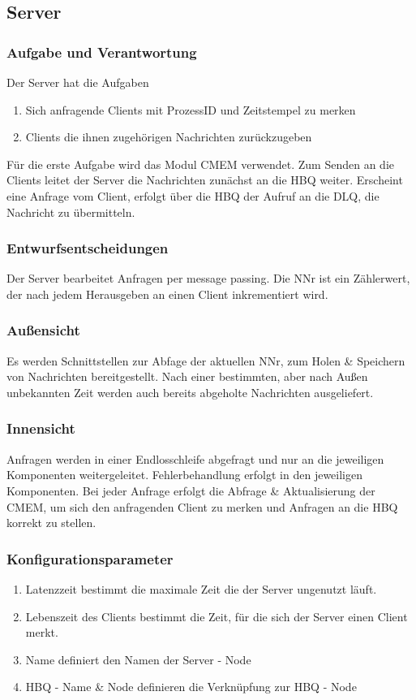 \documentclass{article}
\begin{document}
\subsection{Server}
\subsubsection{Aufgabe und Verantwortung}
Der Server hat die Aufgaben  
\begin{enumerate}
	\item{Sich anfragende Clients mit ProzessID und Zeitstempel zu merken}
    \item{Clients die ihnen zugehörigen Nachrichten zurückzugeben}
\end{enumerate}
Für die erste Aufgabe wird das Modul CMEM verwendet. 
Zum Senden an die Clients leitet der Server die Nachrichten zunächst an die HBQ weiter. 
Erscheint eine Anfrage vom Client, erfolgt über die HBQ der Aufruf an die DLQ, die Nachricht zu übermitteln.

\subsubsection{Entwurfsentscheidungen}
Der Server bearbeitet Anfragen per message passing. Die NNr ist ein Zählerwert, der nach jedem Herausgeben an einen Client inkrementiert wird.

\subsubsection{Außensicht}
Es werden Schnittstellen zur Abfage der aktuellen NNr, zum Holen \& Speichern von Nachrichten bereitgestellt. Nach einer bestimmten, aber nach Außen unbekannten Zeit werden auch bereits abgeholte Nachrichten ausgeliefert.

\subsubsection{Innensicht}
Anfragen werden in einer Endlosschleife abgefragt und nur an die jeweiligen Komponenten weitergeleitet. Fehlerbehandlung erfolgt in den jeweiligen Komponenten. Bei jeder Anfrage erfolgt die Abfrage \& Aktualisierung der CMEM, um sich den anfragenden Client zu merken und Anfragen an die HBQ korrekt zu stellen.
			
\subsubsection{Konfigurationsparameter}
\begin{enumerate}
    \item{Latenzzeit bestimmt die maximale Zeit die der Server ungenutzt läuft.}
    \item{Lebenszeit des Clients bestimmt die Zeit, für die sich der Server einen Client merkt.}
    \item{Name definiert den Namen der Server - Node}
    \item{HBQ - Name \& Node definieren die Verknüpfung zur HBQ - Node}
\end{enumerate}
\end{document}
